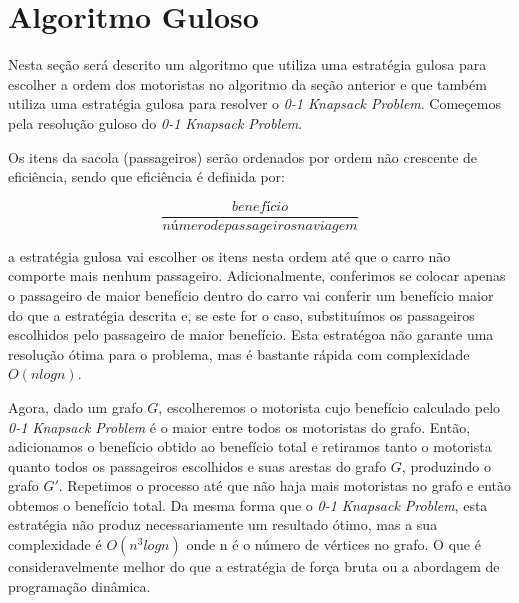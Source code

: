 \documentclass{article}
\begin{document}
\section{Algoritmo Guloso}

Nesta seção será descrito um algoritmo que utiliza uma estratégia gulosa para escolher a ordem dos motoristas no algoritmo
da seção anterior e que também utiliza uma estratégia gulosa para resolver o \textit{0-1 Knapsack Problem}. Começemos pela
resolução guloso do \textit{0-1 Knapsack Problem}.

Os itens da sacola (passageiros) serão ordenados por ordem não crescente de eficiência, sendo que eficiência é definida por:

\[ 
\frac{benefício}{número de passageiros na viagem}
\]

a estratégia gulosa vai escolher os itens nesta ordem até que o carro não comporte mais nenhum passageiro. Adicionalmente,
conferimos se colocar apenas o passageiro de maior benefício dentro do carro vai conferir um benefício maior do que a estratégia
descrita e, se este for o caso, substituímos os passageiros escolhidos pelo passageiro de maior benefício. Esta estratégoa não
garante uma resolução ótima para o problema, mas é bastante rápida com complexidade $ O(nlogn) $.

Agora, dado um grafo $ G $, escolheremos o motorista cujo benefício calculado pelo \textit{0-1 Knapsack Problem} é o maior entre
todos os motoristas do grafo. Então, adicionamos o benefício obtido ao benefício total e retiramos tanto o motorista quanto todos
os passageiros escolhidos e suas arestas do grafo $ G $, produzindo o grafo $ G' $. Repetimos o processo até que não haja mais 
motoristas no grafo e então obtemos o benefício total. Da mesma forma que o \textit{0-1 Knapsack Problem}, esta estratégia não
produz necessariamente um resultado ótimo, mas a sua complexidade é $ O(n^3logn) $ onde n é o número de vértices no grafo. O que é
consideravelmente melhor do que a estratégia de força bruta ou a abordagem de programação dinâmica.
\end{document}
